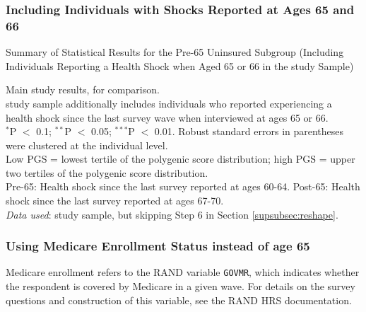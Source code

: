 \subsubsection{Including Individuals with Shocks Reported at Ages 65 and 66}
\begin{table}[ht] \centering
	\vspace{-4mm}
	\caption{Summary of Statistical Results for the Pre-65 Uninsured Subgroup (Including Individuals Reporting a Health Shock when Aged 65 or 66 in the study Sample)}
	\label{suptab:6566}
	\vspace{4mm}
	
			\begin{flushleft}
				Main study results, for comparison.\\
				study sample additionally includes individuals who reported experiencing a health shock since the last survey wave when interviewed at ages 65 or 66.\\
				$^{*}$P $<$ 0.1; $^{**}$P $<$ 0.05; $^{***}$P $<$ 0.01. Robust standard errors in parentheses were clustered at the individual level.\\
				Low PGS = lowest tertile of the polygenic score distribution; high PGS = upper two tertiles of the polygenic score distribution.\\
				Pre-65: Health shock since the last survey reported at ages 60-64. Post-65: Health shock since the last survey reported at ages 67-70.\\
				\textit{Data used}: study sample, but skipping Step 6 in Section \ref{supsubsec:reshape}.
				\vspace{5mm}
			\end{flushleft}
\end{table}


\pagebreak
\newpage

\subsubsection{Using Medicare Enrollment Status instead of age 65}
\label{supsec:robustness_enrollment}
Medicare enrollment refers to the RAND variable {\tt GOVMR}, which indicates whether the respondent is covered by Medicare in a given wave. For details on the survey questions and construction of this variable, see the RAND HRS documentation. %


